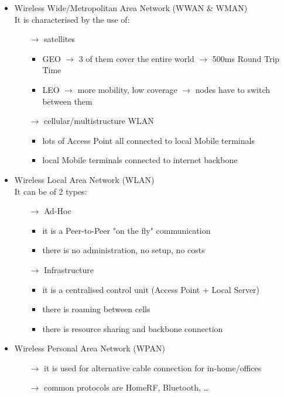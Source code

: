 \begin{itemize}
    \item Wireless Wide/Metropolitan Area Network (WWAN \& WMAN)\\
    It is characterised by the use of:
    \begin{itemize}
        \item[$\rightarrow$] satellites
        \begin{itemize}
            \item GEO $\rightarrow$ 3 of them cover the entire world $\rightarrow$ 500ms Round Trip Time
            \item LEO $\rightarrow$ more mobility, low coverage $\rightarrow$ nodes have to switch\\between them
        \end{itemize}
        \item[$\rightarrow$] cellular/multistructure WLAN
        \begin{itemize}
            \item lots of Access Point all connected to local Mobile terminals
            \item local Mobile terminals connected to internet backbone
        \end{itemize}
    \end{itemize}
    \newpage
    \item Wireless Local Area Network (WLAN)\\[0.2cm]
    It can be of 2 types:
    \begin{itemize}
        \item[$\rightarrow$] Ad-Hoc
        \begin{itemize}
            \item it is a Peer-to-Peer "on the fly" communication
            \item there is no administration, no setup, no costs
        \end{itemize}
        \item[$\rightarrow$] Infrastructure
        \begin{itemize}
            \item it is a centralised control unit (Access Point + Local Server)
            \item there is roaming between cells
            \item there is resource sharing and backbone connection
        \end{itemize}
    \end{itemize}
    \item Wireless Personal Area Network (WPAN)
    \begin{itemize}
        \item[$\rightarrow$] it is used for alternative cable connection for in-home/offices
        \item[$\rightarrow$] common protocols are HomeRF, Bluetooth, \dots
    \end{itemize}
\end{itemize}
